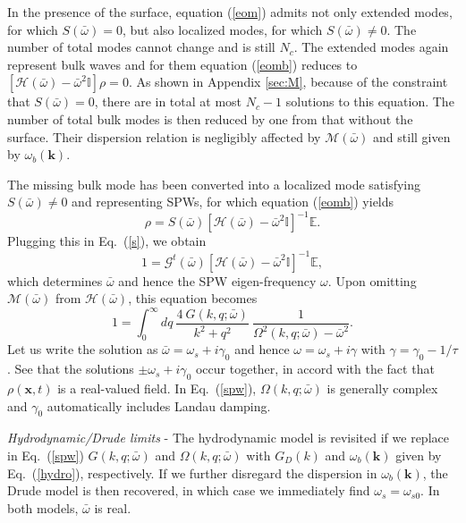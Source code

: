\documentclass[aps,reprint]{revtex4-1}
\begin{document}
In the presence of the surface, equation (\ref{eom}) admits not only extended modes, for which $S(\bar{\omega})=0$, but also localized modes, for which $S(\bar{\omega})\neq 0$. The number of total modes cannot change and is still $N_c$. The extended modes again represent bulk waves and for them equation (\ref{eomb}) reduces to $\left[\mathcal{H}(\bar{\omega}) - \bar{\omega}^2\mathbb{I}\right]\rho = 0$. As shown in Appendix \ref{sec:M}, because of the constraint that $S(\bar{\omega})=0$, there are in total at most $N_c-1$ solutions to this equation. The number of total bulk modes is then reduced by one from that without the surface. Their dispersion relation is negligibly affected by $\mathcal{M}(\bar{\omega})$ and still given by $\omega_b(\mathbf{k})$. 

The missing bulk mode has been converted into a localized mode satisfying $S(\bar{\omega})\neq0$ and representing SPWs, for which equation (\ref{eomb}) yields
\begin{equation}
\rho = S(\bar{\omega}) \left[\mathcal{H}(\bar{\omega}) - \bar{\omega}^2\mathbb{I}\right]^{-1}\mathbb{E}. \label{rho}
\end{equation}
Plugging this in Eq.~(\ref{s}), we obtain 
\begin{equation}
1 = \mathcal{G}^{t}(\bar{\omega})\left[\mathcal{H}(\bar{\omega}) - \bar{\omega}^2\mathbb{I}\right]^{-1}\mathbb{E},
\end{equation}
which determines $\bar{\omega}$ and hence the SPW eigen-frequency $\omega$. Upon omitting $\mathcal{M}(\bar{\omega})$ from $\mathcal{H}(\bar{\omega})$, this equation becomes
\begin{equation}
1 = \int^{\infty}_0 dq~\frac{4~G(k,q;\bar{\omega})}{k^2+q^2}~\frac{1}{\Omega^2(k,q;\bar{\omega}) - \bar{\omega}^2}. \label{spw}
\end{equation}
Let us write the solution as $\bar{\omega} = \omega_s+i\gamma_0$ and hence $\omega = \omega_s+i\gamma$ with $\gamma = \gamma_0-1/\tau$. See that the solutions $\pm\omega_s+i\gamma_0$ occur together, in accord with the fact that $\rho(\mathbf{x},t)$ is a real-valued field. In Eq.~(\ref{spw}), $\Omega(k,q;\bar{\omega})$ is generally complex and $\gamma_0$ automatically includes Landau damping. 

\textit{Hydrodynamic/Drude limits} - The hydrodynamic model is revisited if we replace in Eq.~(\ref{spw}) $G(k,q;\bar{\omega})$ and $\Omega(k,q;\bar{\omega})$ with $G_D(k)$ and $\omega_b(\mathbf{k})$ given by Eq.~(\ref{hydro}), respectively. If we further disregard the dispersion in $\omega_b(\mathbf{k})$, the Drude model is then recovered, in which case we immediately find $\omega_s = \omega_{s0}$. In both models, $\bar{\omega}$ is real. 
\end{document}
